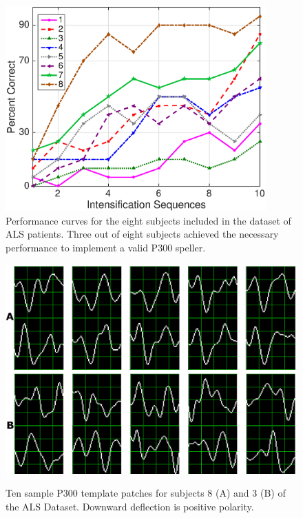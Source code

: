 \documentclass[utf8]{frontiersSCNS} %
\begin{document}
\begin{figure}[h!]
\centering
\includegraphics[width=10cm]{performance.eps}
\caption{Performance curves for the eight subjects included in the dataset of ALS patients.  Three out of eight subjects achieved the necessary performance to implement a valid P300 speller.}
\label{fig:performance}
\end{figure}


\begin{figure}[h!]
\centering
\includegraphics[width=15cm]{subject.png}\label{subject8}
\caption{Ten sample P300 template patches for subjects 8 (A) and 3 (B) of the ALS Dataset.  Downward deflection is positive polarity. }
\label{fig:p300templates}
\end{figure}
\end{document}

